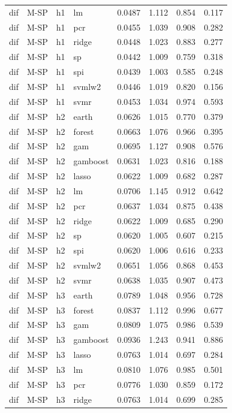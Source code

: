 \begin{ThreePartTable}
\begin{longtable}[t]{llclcccc}
dif & M-SP & h1 & lm & 0.0487 & 1.112 & 0.854 & 0.117\\
dif & M-SP & h1 & pcr & 0.0455 & 1.039 & 0.908 & 0.282\\
dif & M-SP & h1 & ridge & 0.0448 & 1.023 & 0.883 & 0.277\\
dif & M-SP & h1 & sp & 0.0442 & 1.009 & 0.759 & 0.318\\
dif & M-SP & h1 & spi & 0.0439 & 1.003 & 0.585 & 0.248\\
dif & M-SP & h1 & svmlw2 & 0.0446 & 1.019 & 0.820 & 0.156\\
dif & M-SP & h1 & svmr & 0.0453 & 1.034 & 0.974 & 0.593\\
\addlinespace
dif & M-SP & h2 & earth & 0.0626 & 1.015 & 0.770 & 0.379\\
dif & M-SP & h2 & forest & 0.0663 & 1.076 & 0.966 & 0.395\\
dif & M-SP & h2 & gam & 0.0695 & 1.127 & 0.908 & 0.576\\
dif & M-SP & h2 & gamboost & 0.0631 & 1.023 & 0.816 & 0.188\\
dif & M-SP & h2 & lasso & 0.0622 & 1.009 & 0.682 & 0.287\\
dif & M-SP & h2 & lm & 0.0706 & 1.145 & 0.912 & 0.642\\
dif & M-SP & h2 & pcr & 0.0637 & 1.034 & 0.875 & 0.438\\
dif & M-SP & h2 & ridge & 0.0622 & 1.009 & 0.685 & 0.290\\
dif & M-SP & h2 & sp & 0.0620 & 1.005 & 0.607 & 0.215\\
dif & M-SP & h2 & spi & 0.0620 & 1.006 & 0.616 & 0.233\\
dif & M-SP & h2 & svmlw2 & 0.0651 & 1.056 & 0.868 & 0.453\\
dif & M-SP & h2 & svmr & 0.0638 & 1.035 & 0.907 & 0.473\\
\addlinespace
dif & M-SP & h3 & earth & 0.0789 & 1.048 & 0.956 & 0.728\\
dif & M-SP & h3 & forest & 0.0837 & 1.112 & 0.996 & 0.677\\
dif & M-SP & h3 & gam & 0.0809 & 1.075 & 0.986 & 0.539\\
dif & M-SP & h3 & gamboost & 0.0936 & 1.243 & 0.941 & 0.886\\
dif & M-SP & h3 & lasso & 0.0763 & 1.014 & 0.697 & 0.284\\
dif & M-SP & h3 & lm & 0.0810 & 1.076 & 0.985 & 0.501\\
dif & M-SP & h3 & pcr & 0.0776 & 1.030 & 0.859 & 0.172\\
dif & M-SP & h3 & ridge & 0.0763 & 1.014 & 0.699 & 0.285\\

\end{longtable}
\end{ThreePartTable}
